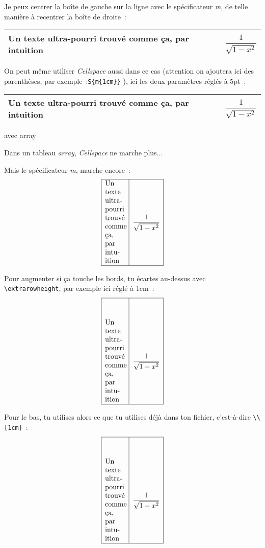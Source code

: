 \documentclass{article}
\begin{document}
Je peux centrer la boîte de gauche sur la ligne avec le spécificateur
\textsl{m}, de telle manière à recentrer la boîte de droite~:
\begin{center}
	\begin{tabular}{|m{1cm}|c|}
		\hline
		Un texte ultra-pourri trouvé comme ça, par intuition
		& $\dfrac{1}{\sqrt{1-x^2}}$\\
		\hline
	\end{tabular}
\end{center}

On peut même utiliser \textsl{Cellspace} aussi dans ce cas (attention on
ajoutera ici des parenthèses, par exemple~:\verb|S{m{1cm}}| ), ici les deux
paramètres réglés à 5pt~:
\begin{center}
	\setlength{\cellspacebottomlimit}{5pt}
	\setlength{\cellspacetoplimit}{5pt}
	\begin{tabular}{|S{m{1cm}}|c|}
		\hline
		Un texte ultra-pourri trouvé comme ça, par intuition
		& $\dfrac{1}{\sqrt{1-x^2}}$\\
		\hline
	\end{tabular}
\end{center}


\pagebreak
\begin{center}
	\Large avec array
\end{center}

Dans un tableau \textsl{array}, \textsl{Cellspace} ne marche plus...

Mais le spécificateur \textsl{m}, marche encore~:
$$
\begin{array}{|m{1cm}|c|}
	\hline
	\textrm{Un texte ultra-pourri trouvé comme ça, par intuition}
	& \dfrac{1}{\sqrt{1-x^2}}\\
	\hline
\end{array}
$$

Pour augmenter si ça touche les bords, tu écartes au-dessus avec
\verb|\extrarowheight|, par exemple ici réglé à 1cm~:
$$
\setlength{\extrarowheight}{1cm}
\begin{array}{|m{1cm}|c|}
	\hline
	\textrm{Un texte ultra-pourri trouvé comme ça, par intuition}
	& \dfrac{1}{\sqrt{1-x^2}}\\
	\hline
\end{array}
$$

Pour le bas, tu utilises alors ce que tu utilises déjà dans ton fichier,
c'est-à-dire \verb|\\[1cm]|~:
$$
\setlength{\extrarowheight}{1cm}
\begin{array}{|m{1cm}|c|}
	\hline
	\textrm{Un texte ultra-pourri trouvé comme ça, par intuition}
	& \dfrac{1}{\sqrt{1-x^2}}\\[1cm]
	\hline
\end{array}
$$
\end{document}
